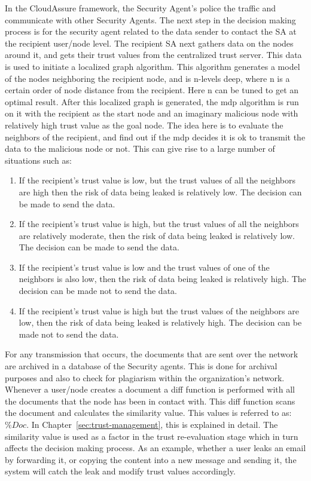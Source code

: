 In the CloudAssure framework, the Security Agent's police the traffic and communicate with other Security Agents. The next step in the decision making process is for the security agent related to the data sender
to contact the SA at the recipient user/node level. The recipient SA next
gathers data on the nodes around it, and gets their trust values from the
centralized trust server. This data is used to initiate a localized graph
algorithm. This algorithm generates a model of the nodes neighboring the
recipient node, and is n-levels deep, where n is a certain order of node
distance from the recipient. Here n can be tuned to get an optimal result.
After this localized graph is generated, the \gls{mdp} algorithm is run on it with
the recipient as the start node and an imaginary malicious node with
relatively high trust value as the goal node. The idea here is to evaluate
the neighbors of the recipient, and find out if the \gls{mdp} decides it is ok to
transmit the data to the malicious node or not. This can give rise to
a large number of situations such as:
\begin{enumerate}
    \item If the recipient's trust value is low, but the trust values of all the
        neighbors are high then the risk of data being leaked is relatively low. The
        decision can be made to send the data.
    \item If the recipient's trust value is high, but the trust values of all the
        neighbors are relatively moderate, then the risk of data being leaked is
        relatively low. The decision can be made to send the data.
    \item If the recipient's trust value is low and the trust values of one of the
        neighbors is also low, then the risk of data being leaked is relatively
        high. The decision can be made not to send the data.
    \item If the recipient's trust value is high but the trust values of the neighbors
are low, then the risk of data being leaked is relatively high. The decision
can be made not to send the data.  
\end{enumerate}
For any transmission that occurs, the
documents that are sent over the network are archived in a database of the
Security agents. This is done for archival purposes and also to check for
plagiarism within the organization's network. Whenever a user/node creates
a document a diff function is performed with all the documents that the node
has been in contact with. This diff function scans the document and
calculates the similarity value. This values is referred to as: \(\%Doc\). In
Chapter~\ref{sec:trust-management}, this is explained in detail. The similarity value is used as a factor in
the trust re-evaluation stage which in turn affects the decision making
process. As an example, whether a user leaks an email by forwarding it, or
copying the content into a new message and sending it, the system will catch
the leak and modify trust values accordingly.

